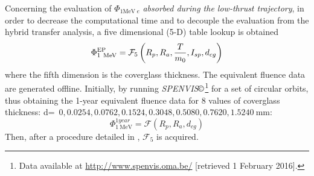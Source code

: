 Concerning the evaluation of $\Phi_{1\si{\mega\electronvolt}~e}$ \emph{absorbed during the low-thrust trajectory}, in order to decrease the computational time and to decouple the evaluation from the hybrid transfer analysis, a five dimensional (5-D) table lookup is obtained
%
\begin{equation}
\Phi_{\scriptstyle{1~\si{\mega\electronvolt}}}^{\scriptstyle{\textsc{EP}}} = \mathcal{F}_5\left(R_p, R_a, \dfrac{T}{m_0}, I_{sp}, d_{cg}\right)
\label{eq:fivetablelookup}
\end{equation}
%
where the fifth dimension is the coverglass thickness.
The equivalent fluence data are generated offline. Initially, by running \textit{SPENVIS}$\copyright$\footnote{Data available at \url{http://www.spenvis.oma.be/} [retrieved 1 February 2016].} for a set of circular orbits, thus obtaining the 1-year equivalent fluence data for 8 values of coverglass thickness: d=~$0   , 0.0254, 0.0762, 0.1524, 0.3048, 0.5080,0.7620, 1.5240~\si{\milli\meter}$:
\begin{equation}
\Phi_{\scriptstyle{1~\si{\mega\electronvolt}}}^{\scriptstyle{1year}} = \mathcal{F}\left(R_p, R_a, d_{cg}\right)\label{eq:1yearphi}
\end{equation}
Then, after a procedure detailed in \cite{tesisimo}, $\mathcal{F}_5$ is acquired.